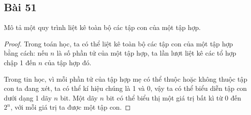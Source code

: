 \subsection*{Bài 51}
Mô tả một quy trình liệt kê toàn bộ các tập con của một tập hợp.
\begin{proof}
    Trong toán học, ta có thể liệt kê toàn bộ các tập con của một tập hợp bằng cách: nếu $n$ là số phần tử của một tập hợp, ta lần lượt liệt kê các tổ hợp chập 1 đến $n$ của tập hợp đó.

    Trong tin học, vì mỗi phần tử của tập hợp mẹ có thể thuộc hoặc không thuộc tập con ta đang xét, ta có thể kí hiệu chúng là 1 và 0, vậy ta có thể biểu diễn tập con dưới dạng 1 dãy $n$ bit. Một dãy $n$ bit có thể biểu thị một giá trị bất kì từ 0 đến $2^n$, với mỗi giá trị ta được một tập con.
\end{proof}